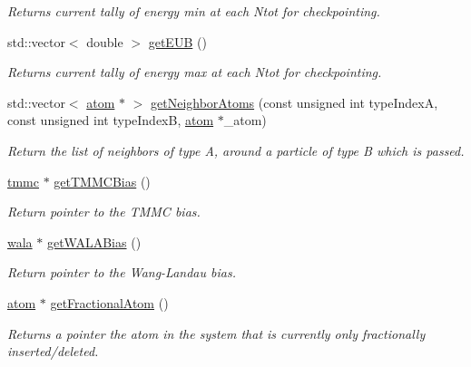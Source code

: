 \begin{DoxyCompactItemize}
\begin{DoxyCompactList}\small\item\em Returns current tally of energy min at each Ntot for checkpointing. \end{DoxyCompactList}\item 
std\-::vector$<$ double $>$ \hyperlink{classsim_system_ae87e0ac03cc11259cd3b44c780a90a06}{get\-E\-U\-B} ()
\begin{DoxyCompactList}\small\item\em Returns current tally of energy max at each Ntot for checkpointing. \end{DoxyCompactList}\item 
std\-::vector$<$ \hyperlink{classatom}{atom} $\ast$ $>$ \hyperlink{classsim_system_a9b3aeefa22c3b50b5913df6eea753bc6}{get\-Neighbor\-Atoms} (const unsigned int type\-Index\-A, const unsigned int type\-Index\-B, \hyperlink{classatom}{atom} $\ast$\-\_\-atom)
\begin{DoxyCompactList}\small\item\em Return the list of neighbors of type A, around a particle of type B which is passed. \end{DoxyCompactList}\item 
\hyperlink{classtmmc}{tmmc} $\ast$ \hyperlink{classsim_system_aa31d40c91cb50f143a9613d362798887}{get\-T\-M\-M\-C\-Bias} ()
\begin{DoxyCompactList}\small\item\em Return pointer to the T\-M\-M\-C bias. \end{DoxyCompactList}\item 
\hyperlink{classwala}{wala} $\ast$ \hyperlink{classsim_system_a7cb5049de8b0988349e89e30e4000407}{get\-W\-A\-L\-A\-Bias} ()
\begin{DoxyCompactList}\small\item\em Return pointer to the Wang-\/\-Landau bias. \end{DoxyCompactList}\item 
\hyperlink{classatom}{atom} $\ast$ \hyperlink{classsim_system_a2ab77377c60e0e3109a6e875690b0ab7}{get\-Fractional\-Atom} ()
\begin{DoxyCompactList}\small\item\em Returns a pointer the atom in the system that is currently only fractionally inserted/deleted. \end{DoxyCompactList}\end{DoxyCompactItemize}

